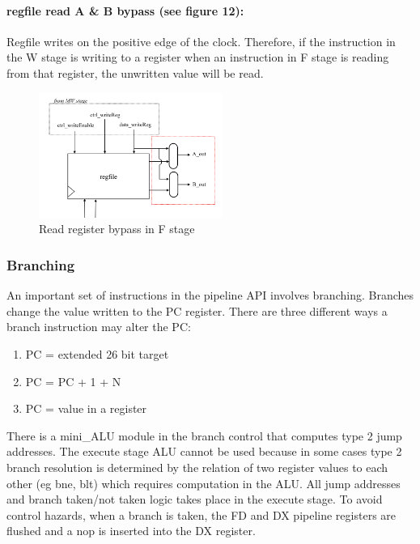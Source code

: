 \documentclass[letterpaper]{article}
\begin{document}
\paragraph{regfile read A \& B bypass (see figure 12):} Regfile writes on the positive edge of the clock. Therefore, if the instruction in the W stage is writing to a register when an instruction in F stage is reading from that register, the unwritten value will be read.
\begin{figure}[h]
    \centering
    \includegraphics[width=6cm]{regreadbypass.png}
    \caption{Read register bypass in F stage}
    \label{fig:my_label}
\end{figure}

\subsubsection{Branching}
An important set of instructions in the pipeline API involves branching. Branches change the value written to the PC register. There are three different ways a branch instruction may alter the PC:
\begin{enumerate}
    \item PC = extended 26 bit target
    \item PC = PC + 1 + N
    \item PC = value in a register
\end{enumerate}
There is a mini\_ALU module in the branch control that computes type 2 jump addresses. The execute stage ALU cannot be used because in some cases type 2 branch resolution is determined by the relation of two register values to each other (eg bne, blt) which requires computation in the ALU. 
\newline
All jump addresses and branch taken/not taken logic takes place in the execute stage. To avoid control hazards, when a branch is taken, the FD and DX pipeline registers are flushed and a nop is inserted into the DX register.
\end{document}
